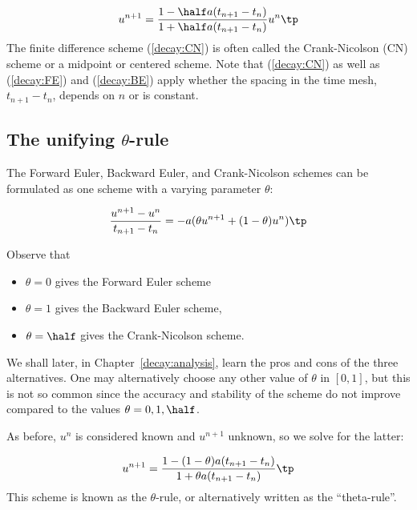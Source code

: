 \documentclass[graybox,sectrefs,envcountresetchap,open=right,final]{svmonodo}
\begin{document}
\begin{equation}
u^{n+1} = \frac{1-\half a(t_{n+1}-t_n)}{1 + \half a(t_{n+1}-t_n)}u^n\tp
\label{decay:CN}
\end{equation}
The finite difference scheme (\ref{decay:CN}) is often called
the Crank-Nicolson (CN) scheme or a midpoint or centered scheme.
Note that (\ref{decay:CN}) as well as (\ref{decay:FE}) and (\ref{decay:BE})
apply whether the spacing in the time mesh, $t_{n+1}-t_n$, depends on $n$
or is constant.


\subsection{The unifying $\theta$-rule}
\label{decay:schemes:theta}

  

The Forward Euler, Backward Euler, and Crank-Nicolson schemes can be
formulated as one scheme with a varying parameter $\theta$:

\begin{equation}
\frac{u^{n+1}-u^{n}}{t_{n+1}-t_n} = -a (\theta u^{n+1} + (1-\theta) u^{n})
\label{decay:th0}
\tp
\end{equation}

Observe that

\begin{itemize}
 \item $\theta =0$ gives the Forward Euler scheme

 \item $\theta =1$ gives the Backward Euler scheme,

 \item $\theta =\half$ gives the Crank-Nicolson scheme.
\end{itemize}

\noindent
We shall later, in Chapter~\ref{decay:analysis}, learn the pros and cons
of the three alternatives.
One may alternatively choose any other value of $\theta$ in $[0,1]$, but
this is not so common since the accuracy and stability of
the scheme do not improve compared
to the values $\theta=0,1,\half$.

As before, $u^n$ is considered known and $u^{n+1}$ unknown, so
we solve for the latter:

\begin{equation}
u^{n+1} = \frac{1 - (1-\theta) a(t_{n+1}-t_n)}{1 + \theta a(t_{n+1}-t_n)}\tp
\label{decay:th}
\end{equation}
This scheme is known as the $\theta$-rule, or alternatively written as
the ``theta-rule''.
\end{document}
